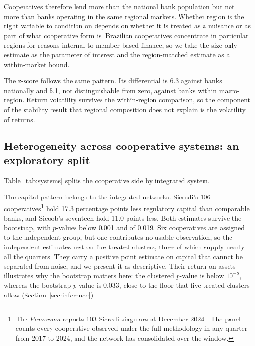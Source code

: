 \documentclass[11pt,a4paper]{article}
\begin{document}
Cooperatives therefore lend more than the national bank population but not more than
banks operating in the same regional markets. Whether region is the right variable to
condition on depends on whether it is treated as a nuisance or as part of what
cooperative form is. Brazilian cooperatives concentrate in particular regions for reasons
internal to member-based finance, so we take the size-only estimate as the parameter of
interest and the region-matched estimate as a within-market bound.

The z-score follows the same pattern. Its differential is 6.3 against banks nationally
and 5.1, not distinguishable from zero, against banks within macro-region. Return
volatility survives the within-region comparison, so the component of the stability
result that regional composition does not explain is the volatility of returns.

\subsection{Heterogeneity across cooperative systems: an exploratory split}

Table~\ref{tab:systems} splits the cooperative side by integrated system.

\begin{table}[htbp]
\centering
\begin{threeparttable}
\caption{Cooperative differential by system, controlled specification}
\label{tab:systems}

\end{threeparttable}
\end{table}

The capital pattern belongs to the integrated networks. Sicredi's 106
cooperatives\footnote{The \textit{Panorama} reports 103 Sicredi singulars at December
2024 \citep{bcb2025panorama}. The panel counts every cooperative observed under the full
methodology in any quarter from 2017 to 2024, and the network has consolidated over the
window.} hold 17.3 percentage points less regulatory capital than comparable banks, and
Sicoob's seventeen hold 11.0 points less. Both estimates survive the bootstrap, with
$p$-values below 0.001 and of 0.019. Six cooperatives are assigned to the independent
group, but one contributes no usable observation, so the independent estimates rest on
five treated clusters, three of which supply nearly all the quarters. They carry a
positive point estimate on capital that cannot be separated from noise, and we present it
as descriptive. Their return on assets illustrates why the bootstrap matters here: the
clustered $p$-value is below $10^{-8}$, whereas the bootstrap $p$-value is 0.033, close
to the floor that five treated clusters allow (Section~\ref{sec:inference}).
\end{document}
